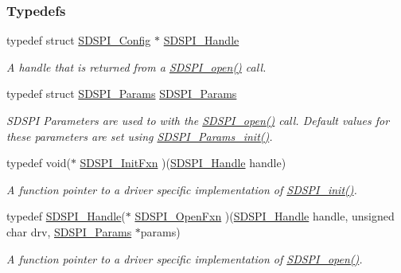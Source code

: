 \subsubsection*{Typedefs}
\begin{DoxyCompactItemize}
\item 
typedef struct \hyperlink{struct_s_d_s_p_i___config}{S\-D\-S\-P\-I\-\_\-\-Config} $\ast$ \hyperlink{_s_d_s_p_i_8h_abd3d22133d60c2e5afd49722d6bafb7e}{S\-D\-S\-P\-I\-\_\-\-Handle}
\begin{DoxyCompactList}\small\item\em A handle that is returned from a \hyperlink{_s_d_s_p_i_8h_af4a5ca9bb35e8a7df02acf20ceeae66d}{S\-D\-S\-P\-I\-\_\-open()} call. \end{DoxyCompactList}\item 
typedef struct \hyperlink{struct_s_d_s_p_i___params}{S\-D\-S\-P\-I\-\_\-\-Params} \hyperlink{_s_d_s_p_i_8h_a3fd9e0fa28415b0c0cf6ab03c37ca4d1}{S\-D\-S\-P\-I\-\_\-\-Params}
\begin{DoxyCompactList}\small\item\em S\-D\-S\-P\-I Parameters are used to with the \hyperlink{_s_d_s_p_i_8h_af4a5ca9bb35e8a7df02acf20ceeae66d}{S\-D\-S\-P\-I\-\_\-open()} call. Default values for these parameters are set using \hyperlink{_s_d_s_p_i_8h_a6fe24eaba1cca88242c5df360a074ca8}{S\-D\-S\-P\-I\-\_\-\-Params\-\_\-init()}. \end{DoxyCompactList}\item 
typedef void($\ast$ \hyperlink{_s_d_s_p_i_8h_a3171d9675e245720a8552f667e33ba54}{S\-D\-S\-P\-I\-\_\-\-Init\-Fxn} )(\hyperlink{_s_d_s_p_i_8h_abd3d22133d60c2e5afd49722d6bafb7e}{S\-D\-S\-P\-I\-\_\-\-Handle} handle)
\begin{DoxyCompactList}\small\item\em A function pointer to a driver specific implementation of \hyperlink{_s_d_s_p_i_8h_a83cfcebe7875d9d8b5e08e57e6785ae6}{S\-D\-S\-P\-I\-\_\-init()}. \end{DoxyCompactList}\item 
typedef \hyperlink{_s_d_s_p_i_8h_abd3d22133d60c2e5afd49722d6bafb7e}{S\-D\-S\-P\-I\-\_\-\-Handle}($\ast$ \hyperlink{_s_d_s_p_i_8h_a2ff79d0b69515e8da6ad65367239236b}{S\-D\-S\-P\-I\-\_\-\-Open\-Fxn} )(\hyperlink{_s_d_s_p_i_8h_abd3d22133d60c2e5afd49722d6bafb7e}{S\-D\-S\-P\-I\-\_\-\-Handle} handle, unsigned char drv, \hyperlink{struct_s_d_s_p_i___params}{S\-D\-S\-P\-I\-\_\-\-Params} $\ast$params)
\begin{DoxyCompactList}\small\item\em A function pointer to a driver specific implementation of \hyperlink{_s_d_s_p_i_8h_af4a5ca9bb35e8a7df02acf20ceeae66d}{S\-D\-S\-P\-I\-\_\-open()}. \end{DoxyCompactList}\item 

\end{DoxyCompactItemize}
